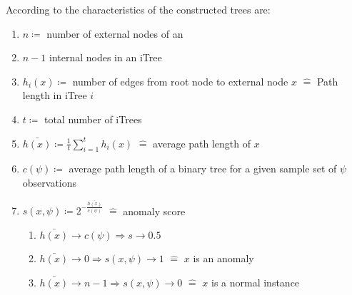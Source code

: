 According to \cite{gruhl2022, liu2008isolation} the characteristics of the constructed trees are:
\begin{enumerate}
    \item $n \coloneqq$ number of external nodes of an 
    \item $n-1$ internal nodes in an \ac{iTree}
    \item $h_i(x) \coloneqq $ number of edges from root node to external node $x$ $\widehat{=}$ Path length in \ac{iTree} $i$
    \item $t \coloneqq$ total number of \acp{iTree}
    \item $\bar {h(x)} \coloneqq \frac{1}{t}\sum_{i=1}^{t}h_i(x)$ $\widehat{=}$ average path length of $x$ 
    \item $c(\psi) \coloneqq $ average path length of a binary tree for a given sample set of $\psi$ observations
    \item $s(x, \psi) \coloneqq 2^{-\frac{\bar {h(x)}}{c(\psi)}}$ $\widehat{=}$ anomaly score 
    \begin{enumerate}
        \item $\bar {h(x)} \to c(\psi) \Rightarrow s \to 0.5$
        \item $\bar {h(x)} \to 0 \Rightarrow s(x, \psi) \to 1$ $\widehat{=}$ $x$ is an anomaly
        \item $\bar {h(x)} \to n-1 \Rightarrow s(x, \psi) \to 0$ $\widehat{=}$ $x$ is a normal instance
    \end{enumerate}
\end{enumerate}
%
